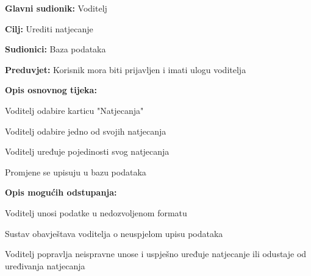					\noindent {}
					\begin{packed_item}
						
						\item \textbf{Glavni sudionik: }Voditelj
						\item  \textbf{Cilj:} Urediti natjecanje
						\item  \textbf{Sudionici:} Baza podataka
						\item  \textbf{Preduvjet:} Korisnik mora biti prijavljen i imati ulogu voditelja
						\item  \textbf{Opis osnovnog tijeka:}
						
						\item[] \begin{packed_enum}
							
							\item Voditelj odabire karticu "Natjecanja"
							\item Voditelj odabire jedno od svojih natjecanja
							\item Voditelj uređuje pojedinosti svog natjecanja
							\item Promjene se upisuju u bazu podataka
						\end{packed_enum}
						
						\item  \textbf{Opis mogućih odstupanja:}
						
						\item[] \begin{packed_item}
							
							\item[3.a] Voditelj unosi podatke u nedozvoljenom formatu
							\item[] \begin{packed_enum}
								
								\item Sustav obavještava voditelja o neuspjelom upisu podataka
								\item Voditelj popravlja neispravne unose i uspješno uređuje natjecanje ili odustaje od uređivanja natjecanja
								
							\end{packed_enum}
						\end{packed_item}
					\end{packed_item}
				
